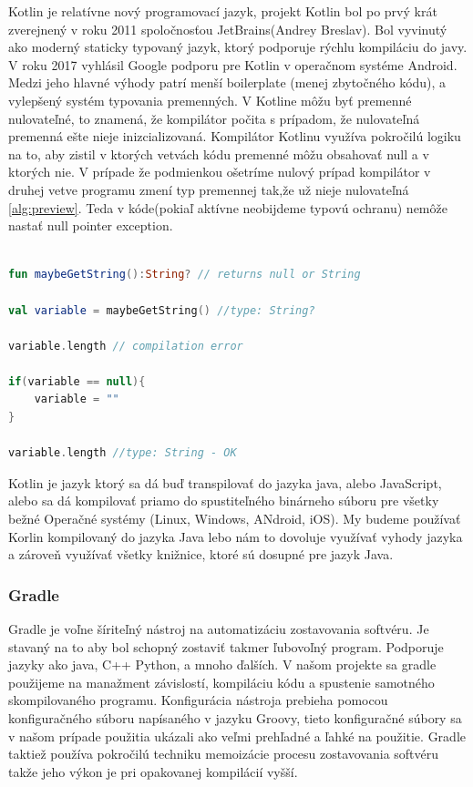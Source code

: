 Kotlin je relatívne nový programovací jazyk, projekt Kotlin bol po prvý krát zverejnený v roku 2011 spoločnosťou JetBrains(Andrey Breslav). Bol vyvinutý ako moderný staticky typovaný jazyk, ktorý podporuje rýchlu kompiláciu do javy. V roku 2017 vyhlásil Google podporu pre Kotlin v operačnom systéme Android.  
Medzi jeho hlavné výhody patrí menší boilerplate (menej zbytočného kódu), a vylepšený systém typovania premenných. V Kotline  môžu byť premenné nulovateľné, to znamená, že kompilátor počita s prípadom, že nulovateľná premenná ešte nieje inizcializovaná. Kompilátor Kotlinu využíva pokročilú logiku na to, aby zistil v ktorých vetvách kódu premenné môžu obsahovať null a v ktorých nie. V prípade že podmienkou ošetríme nulový prípad kompilátor v druhej vetve programu zmení typ premennej tak,že už nieje nulovateľná \ref{alg:preview}. Teda v kóde(pokiaľ aktívne neobijdeme typovú ochranu) nemôže nastať null pointer exception.



\begin{lstlisting}[caption={Ukážka funkcie typov v jazyku Kotlin},label={alg:preview},language=Kotlin]

fun maybeGetString():String? // returns null or String

val variable = maybeGetString() //type: String?

variable.length // compilation error

if(variable == null){
	variable = ""
}

variable.length //type: String - OK

\end{lstlisting}


Kotlin je jazyk ktorý sa dá buď transpilovať do jazyka java, alebo JavaScript, alebo sa dá kompilovať priamo do spustiteľného  binárneho súboru
pre všetky bežné Operačné systémy (Linux, Windows, ANdroid, iOS). My budeme používať Korlin kompilovaný do jazyka Java lebo nám to dovoluje využívať vyhody jazyka a zároveň využívať všetky knižnice, ktoré sú dosupné pre jazyk Java.


\subsubsection{Gradle} 

Gradle je voľne šíriteľný nástroj na automatizáciu zostavovania softvéru. Je stavaný na to aby bol schopný zostaviť takmer ľubovoľný program. Podporuje jazyky ako java, C++ Python, a mnoho ďalších. V našom projekte sa gradle použijeme na manažment závislostí, kompiláciu kódu a spustenie samotného skompilovaného programu. Konfigurácia nástroja prebieha pomocou konfiguračného súboru napísaného v jazyku Groovy, tieto konfiguračné  súbory sa v našom prípade použitia ukázali ako veľmi prehľadné a ľahké na použitie. Gradle taktiež používa pokročilú techniku memoizácie procesu zostavovania softvéru takže jeho výkon je pri opakovanej kompilácií vyšší.

